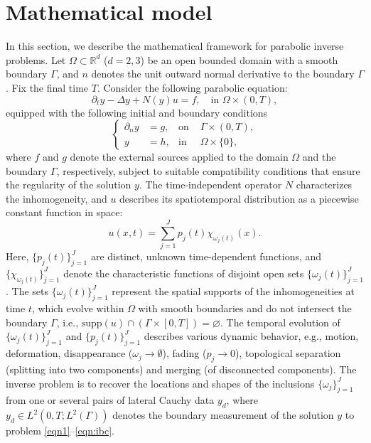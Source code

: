 \documentclass[onefignum,onetabnum]{siamart190516}
\numberwithin{equation}{section}
\begin{document}
\section{Mathematical model}\label{sec:MAT}
In this section, we describe the mathematical framework for parabolic inverse problems.
Let $\Omega\subset \mathbb{R}^{d}$ ($d=2,3$) be an open bounded domain with a smooth boundary $\Gamma$, and $n$ denotes the unit outward normal derivative to the boundary $\Gamma$.
Fix the final
time $T$. Consider the following parabolic equation:
\begin{equation}\label{eqn1}
\partial_{t} y - \Delta y + N(y)u = f, \quad  \text{in } \Omega \times (0, T),
\end{equation}
equipped with the following initial and boundary conditions
\begin{equation}\label{eqn:ibc}
\left\{
\begin{aligned}
{\partial_n} y &= g, & \text{on }& \Gamma \times (0, T), \\
y &= h, & \text{in }& \Omega \times \{0\},
\end{aligned}
\right.
\end{equation}
where $f$ and $g$ denote the external sources applied to the domain $\Omega$ and the boundary $\Gamma$, respectively, subject to suitable compatibility conditions that ensure the regularity of the solution $y$.
The time-independent operator $N$ characterizes the inhomogeneity, and $u$ describes its spatiotemporal distribution as a piecewise constant function in space:
\begin{equation}\label{eqn10}
u(x, t) = \sum_{j=1}^{J} p_{j}(t) \chi_{\omega_{j}(t)}(x).
\end{equation}
Here, $\{p_{j}(t)\}_{j=1}^{J}$ are distinct, unknown time-dependent functions, and $\{\chi_{\omega_{j}(t)}\}_{j=1}^{J}$ denote the characteristic functions of disjoint open sets $\{\omega_{j}(t)\}_{j=1}^{J}$.
The sets $\{\omega_{j}(t)\}_{j=1}^{J}$ represent the spatial supports of the inhomogeneities at time $t$, which evolve within $\Omega$ with smooth boundaries and do not intersect the boundary $\Gamma$, i.e., $\mathrm{supp}(u) \cap \left(\Gamma \times [0, T]\right) = \varnothing$.
The temporal evolution of $\{\omega_{j}(t)\}_{j=1}^{J}$ and $\{p_{j}(t)\}_{j=1}^{J}$ describes various dynamic behavior, e.g., motion, deformation, disappearance ($\omega_{j} \to \emptyset$), fading ($p_{j} \to 0$), topological separation (splitting into two components) and merging (of disconnected components).
The inverse problem is to recover the locations and shapes of the inclusions $\{\omega_{j}\}_{j=1}^{J}$ from one or several pairs of lateral Cauchy data $y_{d}$, where $y_{d} \in L^{2}(0,T; L^{2}(\Gamma))$ denotes the boundary measurement of the solution $y$ to problem \eqref{eqn1}--\eqref{eqn:ibc}.
\end{document}
